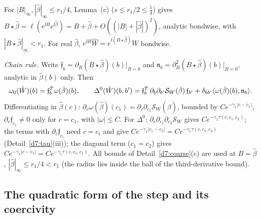 \begin{detail}\label{d7:basedep}
\begin{step}
For $|B|_\infty,|\hat\beta|_\infty\le r_1/4$, Lemma~(c) ($s\le r_1/2\le\frac14$) gives $B\star\hat\beta=\ell(e^{\ii B}e^{\ii\hat\beta})=B+\hat\beta+O((|B|+|\hat\beta|)^2)$, analytic bondwise, with $|B\star\hat\beta|_\infty<r_1$. For real $\hat\beta$, $e^{\ii B}\hat W=e^{\ii(B\star\hat\beta)}W$ bondwise.
\end{step}
\begin{step}
\emph{Chain rule.} Write $\mathfrak f_b=\partial_B(B\star\hat\beta)(b)|_{B=0}$ and $\mathfrak n_b=\partial^2_B(B\star\hat\beta)(b)|_{B=0}$, analytic in $\hat\beta(b)$ only. Then
\[
\omega_0(\hat W)(b)=\mathfrak f_b^T\omega(\hat\beta)(b),\qquad\Delta^0(\hat W)(b,b')=\mathfrak f_b^T\,\partial_b\partial_{b'}\mathcal S_W(\hat\beta)\,\mathfrak f_{b'}+\delta_{bb'}\langle \omega(\hat\beta)(b),\mathfrak n_b\rangle .
\]
Differentiating in $\hat\beta(c)$: $\partial_c\omega(\hat\beta)(c_1)=\partial_c\partial_{c_1}\mathcal S_W(\hat\beta)$, bounded by $Ce^{-\gamma_1|c-c_1|}$; $\partial_c\mathfrak f_{c_1}\ne0$ only for $c=c_1$, with $|\omega|\le C$. For $\Delta^0$: $\partial_c\partial_{c_1}\partial_{c_2}\mathcal S_W$ gives $Ce^{-\gamma_1\tau(c,c_1,c_2)}$; the terms with $\partial_c\mathfrak f_{c_i}$ need $c=c_i$ and give $Ce^{-\gamma_1|c_1-c_2|}=Ce^{-\gamma_1\tau(c,c_1,c_2)}$ (Detail~\ref{d7:tau}(iii)); the diagonal term ($c_1=c_2$) gives $Ce^{-\gamma_1|c-c_1|}=Ce^{-\gamma_1\tau(c,c_1,c_1)}$. All bounds of Detail~\ref{d7:coarse}(c) are used at $B=\hat\beta$, $|\hat\beta|_\infty\le r_1/4<r_1$ (the radius lies inside the ball of the third-derivative bound).
\end{step}
\end{detail}

\subsection{The quadratic form of the step and its coercivity}\label{d7:coerc-sec}

